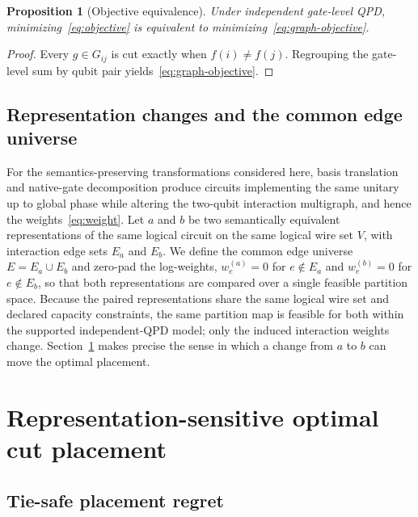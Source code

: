 \documentclass[
  aps,
  pra,
  reprint,
  amsmath,
  amssymb,
  longbibliography,
  nofootinbib,
  floatfix
]{revtex4-2}
\theoremstyle{plain}
\newtheorem{proposition}{Proposition}
\begin{document}
\begin{proposition}[Objective equivalence]\label{prop:obj-equiv}
Under independent gate-level QPD, minimizing~\eqref{eq:objective} is equivalent to minimizing~\eqref{eq:graph-objective}.
\end{proposition}
\begin{proof}
Every $g\in G_{ij}$ is cut exactly when $f(i)\neq f(j)$. Regrouping the gate-level sum by qubit pair yields~\eqref{eq:graph-objective}.
\end{proof}

\subsection{Representation changes and the common edge universe}
\label{sec:rep-changes}

For the semantics-preserving transformations considered here, basis translation and native-gate decomposition produce circuits implementing the same unitary up to global phase while altering the two-qubit interaction multigraph, and hence the weights~\eqref{eq:weight}. Let $a$ and $b$ be two semantically equivalent representations of the same logical circuit on the same logical wire set $V$, with interaction edge sets $E_a$ and $E_b$. We define the common edge universe $E=E_a\cup E_b$ and zero-pad the log-weights, $w^{(a)}_e=0$ for $e\notin E_a$ and $w^{(b)}_e=0$ for $e\notin E_b$, so that both representations are compared over a single feasible partition space. Because the paired representations share the same logical wire set and declared capacity constraints, the same partition map is feasible for both within the supported independent-QPD model; only the induced interaction weights change. Section~\ref{sec:rep} makes precise the sense in which a change from $a$ to $b$ can move the optimal placement.

\section{Representation-sensitive optimal cut placement}
\label{sec:rep}

\subsection{Tie-safe placement regret}
\label{sec:tie-safe}
\end{document}
